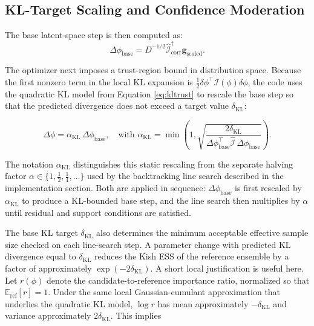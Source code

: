 \subsection{KL-Target Scaling and Confidence Moderation}

The base latent-space step is then computed as:
\begin{equation}
    \Delta \phi_{\mathrm{base}} = D^{-1/2} \widehat{\mathcal{I}}_{\mathrm{corr}}^{\dagger} \mathbf{g}_{\mathrm{scaled}}.
    \label{eq:basestep}
\end{equation}
    
The optimizer next imposes a trust-region bound in distribution space. Because the first nonzero term in the local KL expansion is $\frac{1}{2} \delta \phi^\top \mathcal{I}(\phi) \delta \phi$, the code uses the quadratic KL model from Equation \eqref{eq:kltrust} to rescale the base step so that the predicted divergence does not exceed a target value $\delta_{\mathrm{KL}}$:

\begin{equation}
    \Delta \phi = \alpha_{\mathrm{KL}} \, \Delta \phi_{\mathrm{base}}, \quad \text{with } \alpha_{\mathrm{KL}} = \min\left(1, \sqrt{\frac{2 \delta_{\mathrm{KL}}}{\Delta \phi_{\mathrm{base}}^\top \widehat{\mathcal{I}} \, \Delta \phi_{\mathrm{base}}}}\right).
    \label{eq:klrescale}
\end{equation}

The notation $\alpha_{\mathrm{KL}}$ distinguishes this static rescaling from the separate halving factor $\alpha \in \{1, \tfrac{1}{2}, \tfrac{1}{4}, \ldots\}$ used by the backtracking line search described in the implementation section. Both are applied in sequence: $\Delta\phi_{\mathrm{base}}$ is first rescaled by $\alpha_{\mathrm{KL}}$ to produce a KL-bounded base step, and the line search then multiplies by $\alpha$ until residual and support conditions are satisfied.

The base KL target $\delta_{\mathrm{KL}}$ also determines the minimum acceptable effective sample size checked on each line-search step. A parameter change with predicted KL divergence equal to $\delta_{\mathrm{KL}}$ reduces the Kish ESS of the reference ensemble by a factor of approximately $\exp(-2\delta_{\mathrm{KL}})$. A short local justification is useful here. Let $r(\phi)$ denote the candidate-to-reference importance ratio, normalized so that $\mathbb{E}_{\mathrm{ref}}[r]=1$. Under the same local Gaussian-cumulant approximation that underlies the quadratic KL model, $\log r$ has mean approximately $-\delta_{\mathrm{KL}}$ and variance approximately $2\delta_{\mathrm{KL}}$. This implies

